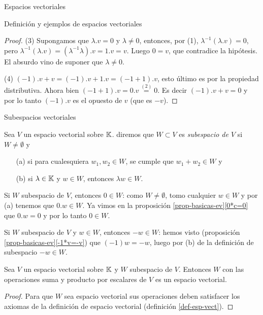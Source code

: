 \begin{chapter}{Espacios vectoriales}
\begin{section}{Definici\'on y ejemplos de espacios vectoriales}
\begin{proof}
                (3) Supongamos que  $\lambda.v=0$ y  $\lambda \ne 0$, entonces, por (1), $ \lambda^{-1}(\lambda.v)=0$, pero $\lambda^{-1}(\lambda.v) = (\lambda^{-1}\lambda).v = 1.v = v$. Luego $0=v$,  que contradice la hipótesis. El absurdo vino de suponer que $\lambda \ne 0$.
                
                (4)  $(-1).v +v = (-1).v +1.v = (-1+1).v$,  esto último es por la propiedad distributiva. Ahora bien $(-1+1).v = 0.v \overset{(2)}{=} 0$. Es decir   $(-1).v +v = 0$ y por lo tanto  $(-1).v$ es el opuesto de $v$ (que es $-v$).  
            
            \end{proof}
   
\end{section}
    
\begin{section}{Subespacios vectoriales}\label{seccion-subespacios-vectoriales}
    \begin{definicion}
        Sea $V$ un espacio vectorial sobre $\mathbb K$. diremos que $W \subset V$ es \textit{subespacio de $V$} si $W \not= \emptyset$ y
        \begin{enumerate}
            \item[(a)] si para cualesquiera $w_1,w_2 \in W$, se cumple que $w_1+w_2 \in W$ y
            \item[(b)] si $\lambda \in \mathbb K$ y  $w \in W$, entonces $\lambda w \in W$.
        \end{enumerate}
    \end{definicion}

    \begin{observacion}\label{obs-0-en-subespacio} Si $W$ subespacio de $V$,  entonces $0 \in W$: como  $W \ne \emptyset$, tomo  cualquier $w \in W$ y  por (a) tenemos que $0.w \in W$. Ya vimos en la proposición \ref{prop-basicas-ev}\ref{0*c=0}  que $0.w =0$ y por lo tanto $0 \in W$. 
    \end{observacion}

    \begin{observacion}\label{obs-opuesto-en-subespacio} Si $W$ subespacio de $V$ y $w \in W$,  entonces $-w \in W$: hemos visto (proposición \ref{prop-basicas-ev}\ref{-1*v=-v}) que  $(-1)w=-w $, luego por (b) de la definición de subespacio $-w \in W$.
    \end{observacion}

    \begin{teorema}
        Sea $V$ un espacio vectorial sobre $\mathbb K$ y $W$ subespacio de $V$. Entonces $W$ con las operaciones suma y producto por escalares de $V$ es un espacio vectorial.
    \end{teorema}
    \begin{proof} 
        Para que $W$ sea espacio vectorial sus operaciones deben satisfacer los axiomas de la definición de espacio vectorial (definición \ref{def-esp-vect}). 
        

\end{proof}
\end{section}
\end{chapter}
